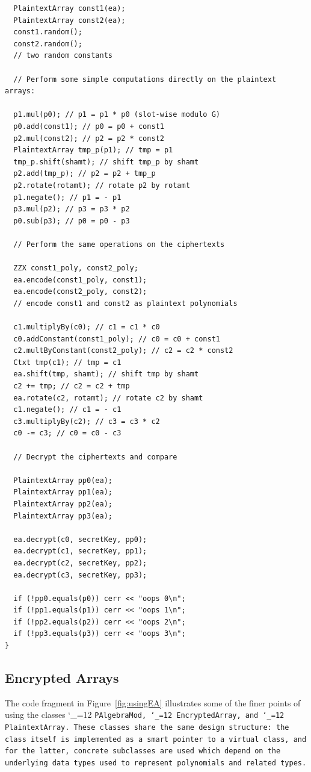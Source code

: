 \documentclass[14pt]{extarticle}
\newcommand{\figref}[1]{Figure~\protect\ref{fig:#1}}
\def\class{%
\begingroup\catcode`\_=12\relax
\classwitharg}
\def\classwitharg#1{\tt #1\endgroup}
\begin{document}
\begin{small}
\begin{verbatim}
  PlaintextArray const1(ea);
  PlaintextArray const2(ea);
  const1.random();
  const2.random();
  // two random constants

  // Perform some simple computations directly on the plaintext arrays:

  p1.mul(p0); // p1 = p1 * p0 (slot-wise modulo G)
  p0.add(const1); // p0 = p0 + const1
  p2.mul(const2); // p2 = p2 * const2
  PlaintextArray tmp_p(p1); // tmp = p1
  tmp_p.shift(shamt); // shift tmp_p by shamt
  p2.add(tmp_p); // p2 = p2 + tmp_p
  p2.rotate(rotamt); // rotate p2 by rotamt
  p1.negate(); // p1 = - p1
  p3.mul(p2); // p3 = p3 * p2
  p0.sub(p3); // p0 = p0 - p3

  // Perform the same operations on the ciphertexts

  ZZX const1_poly, const2_poly;
  ea.encode(const1_poly, const1);
  ea.encode(const2_poly, const2);
  // encode const1 and const2 as plaintext polynomials

  c1.multiplyBy(c0); // c1 = c1 * c0              
  c0.addConstant(const1_poly); // c0 = c0 + const1    
  c2.multByConstant(const2_poly); // c2 = c2 * const2 
  Ctxt tmp(c1); // tmp = c1
  ea.shift(tmp, shamt); // shift tmp by shamt
  c2 += tmp; // c2 = c2 + tmp                      
  ea.rotate(c2, rotamt); // rotate c2 by shamt          
  c1.negate(); // c1 = - c1                    
  c3.multiplyBy(c2); // c3 = c3 * c2
  c0 -= c3; // c0 = c0 - c3                       

  // Decrypt the ciphertexts and compare

  PlaintextArray pp0(ea);
  PlaintextArray pp1(ea);
  PlaintextArray pp2(ea);
  PlaintextArray pp3(ea);

  ea.decrypt(c0, secretKey, pp0);
  ea.decrypt(c1, secretKey, pp1);
  ea.decrypt(c2, secretKey, pp2);
  ea.decrypt(c3, secretKey, pp3);

  if (!pp0.equals(p0)) cerr << "oops 0\n";
  if (!pp1.equals(p1)) cerr << "oops 1\n";
  if (!pp2.equals(p2)) cerr << "oops 2\n";
  if (!pp3.equals(p3)) cerr << "oops 3\n";
}
\end{verbatim}
\end{small}

\subsection{Encrypted Arrays} \label{sec:usingEncryptedArrays}
The code fragment in \figref{usingEA}
illustrates some of the finer points of
using the classes \class{PAlgebraMod}, \class{EncryptedArray},
and \class{PlaintextArray}.  These classes share the same design
structure: the class itself is implemented as a smart pointer  to a
virtual class, and for the latter, concrete subclasses are used which
depend on the underlying data types used to represent polynomials and
related types.
\end{document}
